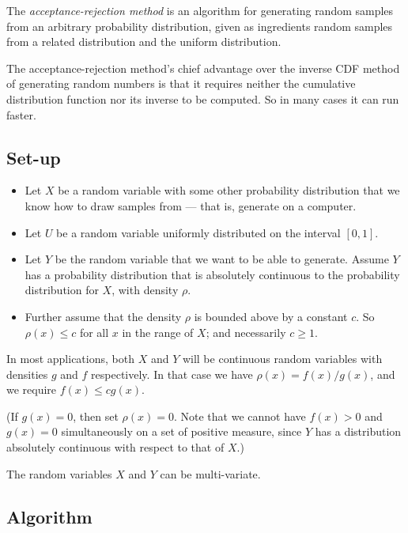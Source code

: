 \documentclass[12pt]{article}
\begin{document}


The \emph{acceptance-rejection method}
is an algorithm for generating random samples from
an arbitrary probability distribution, given 
as ingredients random samples from a related distribution and the 
uniform distribution.

The acceptance-rejection method's chief advantage over the inverse CDF
method of generating random numbers 
is that it requires neither the cumulative distribution function
nor its inverse to be computed.  So in many cases it can run faster.

\subsection*{Set-up}

\begin{itemize}
\item
Let $X$ be a random variable with some other probability distribution
that we know how to draw samples from --- that is, generate on a computer.
\item
Let $U$ be a random variable uniformly distributed on the interval $[0,1]$.
\item
Let $Y$ be the random variable that we want to be able to generate.
Assume $Y$ has a probability distribution that
is absolutely continuous to the probability distribution for $X$,
with density $\rho$.
\item
Further assume that the density $\rho$ is bounded above by
a constant $c$.
So $\rho(x) \leq c$ for all $x$ in the range of $X$;
and necessarily $c \geq 1$.
\end{itemize}

In most applications, both $X$
and $Y$ will be continuous random variables
with densities $g$ and $f$ respectively.
In that case we have $\rho(x) = f(x)/g(x)$,
and we require $f(x) \leq c g(x)$.

(If $g(x) = 0$, then set $\rho(x) = 0$.
Note that we cannot have $f(x) > 0$ and $g(x) = 0$ simultaneously
on a set of positive measure, since $Y$ has a distribution
absolutely continuous with respect to that of $X$.)

The random variables $X$ and $Y$ can be multi-variate.

\subsection*{Algorithm}
\end{document}
